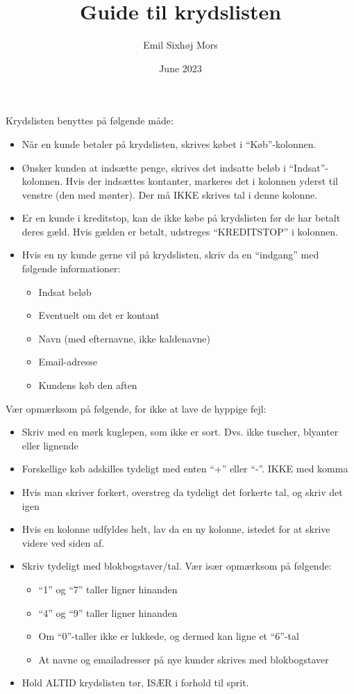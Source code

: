 \documentclass{article}
\title{Guide til krydslisten}
\author{Emil Sixhøj Mors}
\date{June 2023}
\begin{document}
\maketitle
Krydslisten benyttes på følgende måde:

\begin{itemize}
    \item Når en kunde betaler på krydslisten, skrives købet i ``Køb''-kolonnen.
    \item Ønsker kunden at indsætte penge, skrives det indsatte beløb i ``Indsat''-kolonnen. Hvis der indsættes kontanter, 
    markeres det i kolonnen yderst til venstre (den med mønter). Der må IKKE skrives tal i denne kolonne.
    \item Er en kunde i kreditstop, kan de ikke købe på krydslisten før de har betalt deres gæld. Hvis gælden er betalt, 
    udstreges ``KREDITSTOP'' i kolonnen.
    \item Hvis en ny kunde gerne vil på krydslisten, skriv da en ``indgang'' med følgende informationer:
    \begin{itemize}
        \item Indsat beløb
        \item Eventuelt om det er kontant
        \item Navn (med efternavne, ikke kaldenavne)
        \item Email-adresse
        \item Kundens køb den aften
    \end{itemize}
\end{itemize}

Vær opmærksom på følgende, for ikke at lave de hyppige fejl:
\begin{itemize}
    \item Skriv med en mørk kuglepen, som ikke er sort. Dvs. ikke tuscher, blyanter eller lignende
    \item Forskellige køb adskilles tydeligt med enten ``+'' eller ``-''. IKKE med komma
    \item Hvis man skriver forkert, overstreg da tydeligt det forkerte tal, og skriv det igen
    \item Hvis en kolonne udfyldes helt, lav da en ny kolonne, istedet for at skrive videre ved siden af.
    \item Skriv tydeligt med blokbogstaver/tal. Vær især opmærksom på følgende:
    \begin{itemize}
        \item ``1'' og ``7'' taller ligner hinanden
        \item ``4'' og ``9'' taller ligner hinanden
        \item Om ``0''-taller ikke er lukkede, og dermed kan ligne et ``6''-tal
        \item At navne og emailadresser på nye kunder skrives med blokbogstaver
    \end{itemize}
    \item Hold ALTID krydslisten tør, ISÆR i forhold til sprit.
\end{itemize}
\end{document}
